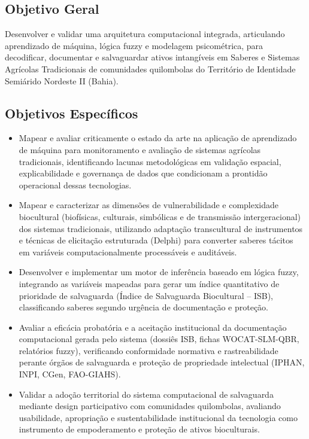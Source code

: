 \subsection{Objetivo Geral}

Desenvolver e validar uma arquitetura computacional integrada, articulando aprendizado de máquina, lógica fuzzy e modelagem psicométrica, para decodificar, documentar e salvaguardar ativos intangíveis em Saberes e Sistemas Agrícolas Tradicionais de comunidades quilombolas do Território de Identidade Semiárido Nordeste II (Bahia).

\subsection{Objetivos Específicos}

\begin{itemize}

\item Mapear e avaliar criticamente o estado da arte na aplicação de aprendizado de máquina para monitoramento e avaliação de sistemas agrícolas tradicionais, identificando lacunas metodológicas em validação espacial, explicabilidade e governança de dados que condicionam a prontidão operacional dessas tecnologias.

\item Mapear e caracterizar as dimensões de vulnerabilidade e complexidade biocultural (biofísicas, culturais, simbólicas e de transmissão intergeracional) dos sistemas tradicionais, utilizando adaptação transcultural de instrumentos e técnicas de elicitação estruturada (Delphi) para converter saberes tácitos em variáveis computacionalmente processáveis e auditáveis.

\item Desenvolver e implementar um motor de inferência baseado em lógica fuzzy, integrando as variáveis mapeadas para gerar um índice quantitativo de prioridade de salvaguarda (Índice de Salvaguarda Biocultural -- ISB), classificando saberes segundo urgência de documentação e proteção.

\item Avaliar a eficácia probatória e a aceitação institucional da documentação computacional gerada pelo sistema (dossiês ISB, fichas WOCAT-SLM-QBR, relatórios fuzzy), verificando conformidade normativa e rastreabilidade perante órgãos de salvaguarda e proteção de propriedade intelectual (IPHAN, INPI, CGen, FAO-GIAHS).

\item Validar a adoção territorial do sistema computacional de salvaguarda mediante design participativo com comunidades quilombolas, avaliando usabilidade, apropriação e sustentabilidade institucional da tecnologia como instrumento de empoderamento e proteção de ativos bioculturais.


\end{itemize}


